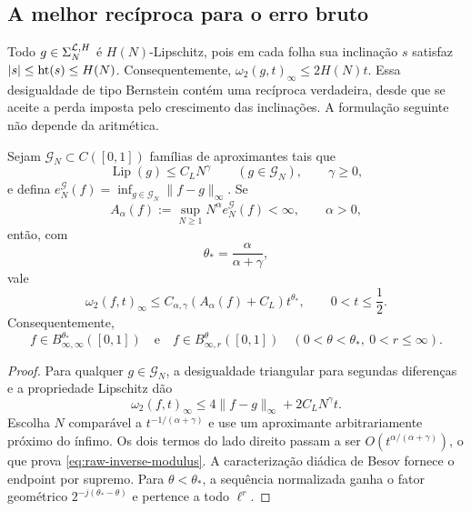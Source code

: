 \subsection{A melhor recíproca para o erro bruto}

Todo $g\in\Sigma_N^{\mathcal{L},H}$ é $H(N)$-Lipschitz, pois em cada folha sua
inclinação $s$ satisfaz $|s|\le\operatorname{ht}(s)\le H(N)$. Consequentemente,
$\omega_2(g,t)_\infty\le2H(N)t$. Essa desigualdade de tipo Bernstein contém
uma recíproca verdadeira, desde que se aceite a perda imposta pelo crescimento
das inclinações. A formulação seguinte não depende da aritmética.

\begin{theorem}
\label{thm:raw-lossy-inverse}
Sejam $\mathcal G_N\subset C([0,1])$ famílias de aproximantes tais que
\begin{equation}
 \operatorname{Lip}(g)\le C_LN^\gamma
 \qquad(g\in\mathcal G_N),
 \qquad \gamma\ge0,
 \label{eq:lipschitz-growth-family}
\end{equation}
e defina
$e_N^{\mathcal G}(f)=\inf_{g\in\mathcal G_N}\|f-g\|_\infty$. Se
\begin{equation}
 A_\alpha(f):=\sup_{N\ge1}N^\alpha e_N^{\mathcal G}(f)<\infty,
 \qquad \alpha>0,
 \label{eq:raw-rate-assumption}
\end{equation}
então, com
\begin{equation}
 \theta_* = \frac{\alpha}{\alpha+\gamma},
 \label{eq:critical-reverse-exponent}
\end{equation}
vale
\begin{equation}
 \omega_2(f,t)_\infty
 \le C_{\alpha,\gamma}(A_\alpha(f)+C_L)t^{\theta_*},
 \qquad 0<t\le\frac12.
 \label{eq:raw-inverse-modulus}
\end{equation}
Consequentemente,
\begin{equation}
 f\in B^{\theta_*}_{\infty,\infty}([0,1])
 \quad\text{e}\quad
 f\in B^\theta_{\infty,r}([0,1])
 \quad(0<\theta<\theta_*,\ 0<r\le\infty).
 \label{eq:raw-inverse-besov}
\end{equation}
\end{theorem}

\begin{proof}
Para qualquer $g\in\mathcal G_N$, a desigualdade triangular para segundas
diferenças e a propriedade Lipschitz dão
\begin{equation}
 \omega_2(f,t)_\infty
 \le4\|f-g\|_\infty+2C_LN^\gamma t.
 \label{eq:inverse-balance}
\end{equation}
Escolha $N$ comparável a $t^{-1/(\alpha+\gamma)}$ e use um aproximante
arbitrariamente próximo do ínfimo. Os dois termos do lado direito passam a
ser $O(t^{\alpha/(\alpha+\gamma)})$, o que prova
\eqref{eq:raw-inverse-modulus}. A caracterização diádica de Besov fornece o
endpoint por supremo. Para $\theta<\theta_*$, a sequência normalizada ganha o
fator geométrico $2^{-j(\theta_*-\theta)}$ e pertence a todo $\ell^r$.
\end{proof}

